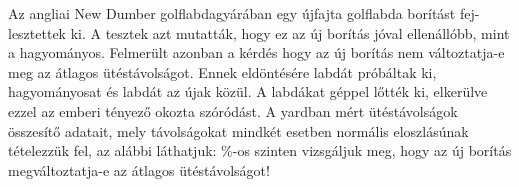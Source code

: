 Az angliai New Dumber golflabdagyárában egy újfajta golflabda borítást fej-
lesztettek ki. A tesztek azt mutatták, hogy ez az új borítás jóval ellenállóbb,
mint a hagyományos. Felmerült azonban a kérdés hogy az új borítás nem
változtatja-e meg az átlagos ütéstávolságot. Ennek eldöntésére  
labdát próbáltak ki,  hagyományosat és  labdát az újak közül. A labdákat géppel
lőtték ki, elkerülve ezzel az emberi tényező okozta szóródást. A yardban mért
ütéstávolságok összesítő adatait, mely távolságokat mindkét esetben normális
eloszlásúnak tételezzük fel, az alábbi láthatjuk:
\%-os szinten vizsgáljuk meg, hogy az új borítás 
megváltoztatja-e az átlagos ütéstávolságot!